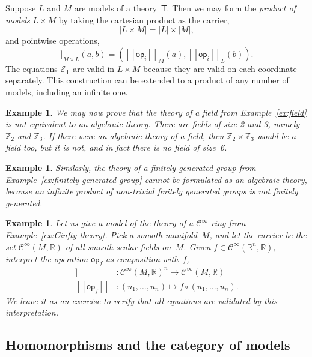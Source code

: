 \documentclass{amsart}
\newcommand{\RR}{\mathbb{R}} %
\newcommand{\ZZ}{\mathbb{Z}} %
\newcommand{\theory}[1]{\mathsf{#1}} %
\newcommand{\equations}[1]{\mathcal{E}_{\theory{#1}}} %
\newcommand{\carrier}[1]{|#1|} %
\newcommand{\op}[1]{\mathsf{op}_{#1}} %
\newcommand{\Cinfty}{\mathcal{C}^\infty}
\newcommand{\sem}[1]{[\![#1]\!]} %
\newtheorem{example}[definition]{Example}
\begin{document}
Suppose $L$ and $M$ are models of a theory~$\theory{T}$. Then we may form the
\emph{product of models} $L \times M$ by taking the cartesian product as the carrier,
%
\begin{equation*}
  \carrier{L \times M} = \carrier{L} \times \carrier{M},
\end{equation*}
%
and pointwise operations,
%
\begin{equation*}
  \sem{\op{i}}_{M \times L}(a, b) = (\sem{\op{i}}_M(a), \sem{\op{i}}_L(b)).
\end{equation*}
%
The equations $\equations{T}$ are valid in $L \times M$ because they are valid on each
coordinate separately. This construction can be extended to a product of any number of
models, including an infinite one.

\begin{example}
  We may now prove that the theory of a field from Example~\ref{ex:field} is not
  equivalent to an algebraic theory. There are fields of size 2 and 3, namely $\ZZ_2$ and
  $\ZZ_3$. If there were an algebraic theory of a field, then $\ZZ_2 \times \ZZ_3$ would
  be a field too, but it is not, and in fact there is no field of size~6.
\end{example}

\begin{example}
  Similarly, the theory of a finitely generated group from
  Example~\ref{ex:finitely-generated-group} cannot be formulated as an algebraic theory,
  because an infinite product of non-trivial finitely generated groups is not finitely
  generated.
\end{example}

\begin{example}
  Let us give a model of the theory of a $\Cinfty$-ring from
  Example~\ref{ex:Cinfty-theory}. Pick a smooth manifold~$M$, and let the carrier be the
  set $\Cinfty(M, \RR)$ of all smooth scalar fields on~$M$. Given
  $f \in \Cinfty(\RR^n, \RR)$, interpret the operation $\op{f}$ as composition with~$f$,
  \begin{align*}
    \sem{\op{f}} &: \Cinfty(M, \RR)^n \to \Cinfty(M, \RR) \\
    \sem{\op{f}} &: (u_1, \ldots, u_n) \mapsto f \circ (u_1, \ldots, u_n).
  \end{align*}
  We leave it as an exercise to verify that all equations are validated by this
  interpretation.
\end{example}

\subsection{Homomorphisms and the category of models}
\label{sec:homom-categ-models}
\end{document}
